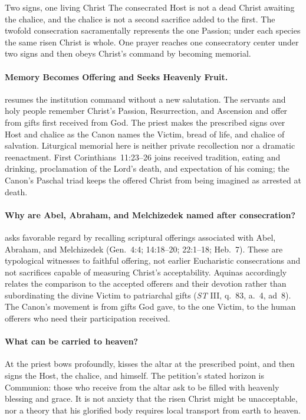 \begin{massbox}{Two signs, one living Christ}
The consecrated Host is not a dead Christ awaiting the chalice, and the chalice is not a second sacrifice added to the first. The twofold consecration sacramentally represents the one Passion; under each species the same risen Christ is whole. One prayer reaches one consecratory center under two signs and then obeys Christ's command by becoming memorial.
\end{massbox}

\paragraph{Memory Becomes Offering and Seeks Heavenly Fruit.}

 resumes the institution command without a new salutation. The servants and holy people remember Christ's Passion, Resurrection, and Ascension and offer from gifts first received from God. The priest makes the prescribed signs over Host and chalice as the Canon names the Victim, bread of life, and chalice of salvation. Liturgical memorial here is neither private recollection nor a dramatic reenactment. First Corinthians~11:23--26 joins received tradition, eating and drinking, proclamation of the Lord's death, and expectation of his coming; the Canon's Paschal triad keeps the offered Christ from being imagined as arrested at death.

\paragraph{Why are Abel, Abraham, and Melchizedek named after consecration?}
 asks favorable regard by recalling scriptural offerings associated with Abel, Abraham, and Melchizedek (Gen.~4:4; 14:18--20; 22:1--18; Heb.~7). These are typological witnesses to faithful offering, not earlier Eucharistic consecrations and not sacrifices capable of measuring Christ's acceptability. Aquinas accordingly relates the comparison to the accepted offerers and their devotion rather than subordinating the divine Victim to patriarchal gifts (\emph{ST} III, q.~83, a.~4, ad~8). The Canon's movement is from gifts God gave, to the one Victim, to the human offerers who need their participation received.

\paragraph{What can be carried to heaven?}
At  the priest bows profoundly, kisses the altar at the prescribed point, and then signs the Host, the chalice, and himself. The petition's stated horizon is Communion: those who receive from the altar ask to be filled with heavenly blessing and grace. It is not anxiety that the risen Christ might be unacceptable, nor a theory that his glorified body requires local transport from earth to heaven.

